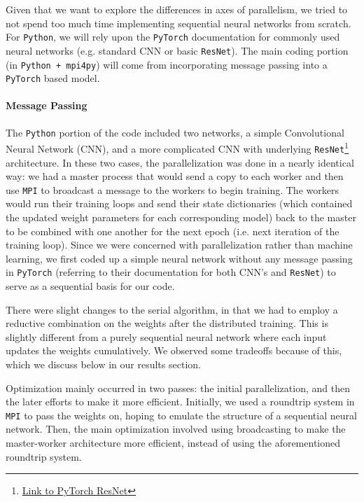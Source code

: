 \documentclass{article}
\begin{document}
Given that we want to explore the differences in axes of parallelism, we tried to not spend too much time implementing sequential neural networks from scratch. For \texttt{Python}, we will rely upon the \texttt{PyTorch} documentation for commonly used neural networks (e.g. standard CNN or basic \texttt{ResNet}). The main coding portion (in \texttt{Python + mpi4py}) will come from incorporating message passing into a \texttt{PyTorch} based model.

\paragraph{Message Passing}

The \texttt{Python} portion of the code included two networks, a simple Convolutional Neural Network (CNN), and a more complicated CNN with underlying \texttt{ResNet}\footnote{\href{https://pytorch.org/hub/pytorch_vision_resnet/}{Link to PyTorch ResNet}} architecture. In these two cases, the parallelization was done in a nearly identical way: we had a master process that would send a copy to each worker and then use \texttt{MPI} to broadcast a message to the workers to begin training. The workers would run their training loops and send their state dictionaries (which contained the updated weight parameters for each corresponding model) back to the master to be combined with one another for the next epoch (i.e. next iteration of the training loop). Since we were concerned with parallelization rather than machine learning, we first coded up a simple neural network without any message passing in \texttt{PyTorch} (referring to their documentation for both CNN's and \texttt{ResNet}) to serve as a sequential basis for our code.

There were slight changes to the serial algorithm, in that we had to employ a reductive combination on the weights after the distributed training. This is slightly different from a purely sequential neural network where each input updates the weights cumulatively. We observed some tradeoffs because of this, which we discuss below in our results section.

Optimization mainly occurred in two passes: the initial parallelization, and then the later efforts to make it more efficient. Initially, we used a roundtrip system in \texttt{MPI} to pass the weights on, hoping to emulate the structure of a sequential neural network. Then, the main optimization involved using broadcasting to make the master-worker architecture more efficient, instead of using the aforementioned roundtrip system.
\end{document}
